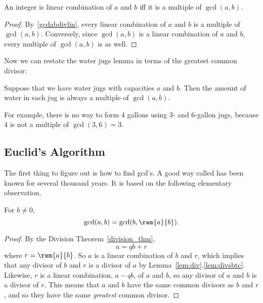 \begin{editingnotes}
\begin{corollary}\label{cor:lin-comb-edit}
An integer is linear combination of $a$ and $b$ iff it is a multiple
of $\gcd(a, b)$.
\end{corollary}

\begin{proof} By~\eqref{gcdabdivlin}, every linear combination of $a$ and $b$ is a
multiple of $\gcd(a, b)$.  Conversely, since $\gcd(a, b)$ is a linear
combination of $a$ and $b$, every multiple of $\gcd(a, b)$ is as
well.  \end{proof}

Now we can restate the water jugs lemma in terms of the greatest
common divisor:

\begin{corollary} \label{cor:waterjugs_note} Suppose that we have water jugs with
capacities $a$ and $b$.  Then the amount of water in each jug is
always a multiple of $\gcd(a, b)$.
\end{corollary}

For example, there is no way to form 4 gallons using 3- and 6-gallon
jugs, because 4 is not a multiple of $\gcd(3, 6) = 3$.

\end{editingnotes}
\fi

\subsection{Euclid's Algorithm}
The first thing to figure out is how to find gcd's.  A good way called  has been known for several thousand years.  It is based on the following
elementary observation.

\begin{lemma}\label{lem:gcdrem}
For $b \neq 0$,
\[
\gcd(a, b) = \gcd(b, \rem{a}{b}).
\]

\begin{proof}
By the Division Theorem~\ref{division_thm},
\begin{equation}\label{aqbrprf}
a = qb + r
\end{equation}
where $r = \rem{a}{b}$.  So $a$ is a linear combination of $b$ and
$r$, which implies that any divisor of $b$ and $r$ is a divisor of $a$
by Lemma~\ref{lem:div}.\ref{lem:divsbtc}.  Likewise, $r$ is a linear
combination, $a-qb$, of $a$ and $b$, so any divisor of $a$ and $b$ is
a divisor of $r$.  This means that $a$ and $b$ have the same common
divisors as $b$ and $r$, and so they have the same \emph{greatest}
common divisor.
\end{proof}
\end{lemma}

